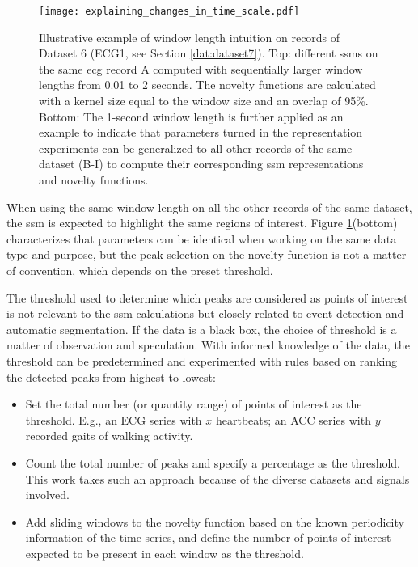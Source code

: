 \begin{figure}
    \centering
    \texttt{[image: explaining\_changes\_in\_time\_scale.pdf]}
    \caption{Illustrative example of window length intuition on records of Dataset 6 (ECG1, see Section \ref{dat:dataset7}). Top: different \gls{ssm}s on the same \gls{ecg} record A computed with sequentially larger window lengths from 0.01 to 2 seconds. The novelty functions are calculated with a kernel size equal to the window size and an overlap of 95\%. Bottom: The 1-second window length is further applied as an example to indicate that parameters turned in the representation experiments can be generalized to all other records of the same dataset (B-I) to compute their corresponding \gls{ssm} representations and novelty functions.}
    \label{fig:intuition}
\end{figure}

When using the same window length on all the other records of the same dataset, the \gls{ssm} is expected to highlight the same regions of interest. Figure \ref{fig:intuition}(bottom) characterizes that parameters can be identical when working on the same data type and purpose, but the peak selection on the novelty function is not a matter of convention, which depends on the preset threshold.

The threshold used to determine which peaks are considered as points of interest is not relevant to the \gls{ssm} calculations but closely related to event detection and automatic segmentation. If the data is a black box, the choice of threshold is a matter of observation and speculation. With informed knowledge of the data, the threshold can be predetermined and experimented with rules based on ranking the detected peaks from highest to lowest:

\begin{itemize}
    \item Set the total number (or quantity range) of points of interest as the threshold. E.g., an ECG series with $x$ heartbeats; an ACC series with $y$ recorded gaits of walking activity.
    \item Count the total number of peaks and specify a percentage as the threshold. This work takes such an approach because of the diverse datasets and signals involved.
    \item Add sliding windows to the novelty function based on the known periodicity information of the time series, and define the number of points of interest expected to be present in each window as the threshold.
\end{itemize}


